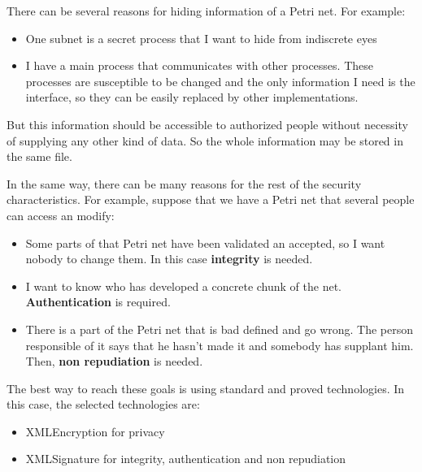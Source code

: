 There can be several reasons for hiding information of a Petri net. For example:

\begin{itemize}
\item One subnet is a secret process that I want to hide from indiscrete
eyes
\item I have a main process that communicates with other processes. These
processes are susceptible to be changed and the only information I need is
the interface, so they can be easily replaced by other implementations.
\end{itemize}

But this information should be accessible to authorized
people without necessity of supplying any other kind of data.
So the whole information may be stored in the same file.

In the same way, there can be many reasons for the rest of the security characteristics.
For example, suppose that we have a Petri net that several people can access
an modify:
\begin{itemize}
\item Some parts of that Petri net have been validated an accepted, so I
want nobody to change them. In this case  \textbf{integrity} is needed.
\item I want to know who has developed a concrete chunk of the net. \textbf{Authentication}
is required.

\item There is a part of the Petri net that is bad defined and go wrong.
The person responsible of it says that he hasn't made it and somebody has
supplant him. Then, \textbf{non repudiation} is needed.
\end{itemize}



The best way to reach these goals is using standard and proved
technologies. In this case, the selected technologies are: 
\begin{itemize}
\item XMLEncryption\cite{XMLENC-w3.org/xmlenc-core1} for privacy
\item XMLSignature \cite{XMLSIG-w3.org/xmlsig-core1} for integrity, authentication and non repudiation
\end{itemize}



